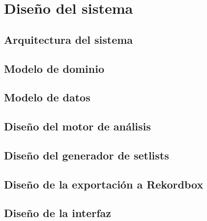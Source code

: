
\chapter{Diseño del sistema}
\label{cha:diseno}

\section{Arquitectura del sistema}
\label{sec:dis-arquitectura}


\section{Modelo de dominio}
\label{sec:dis-dominio}


\section{Modelo de datos}
\label{sec:dis-datos}


\section{Diseño del motor de análisis}
\label{sec:dis-analisis}


\section{Diseño del generador de setlists}
\label{sec:dis-generador}


\section{Diseño de la exportación a Rekordbox}
\label{sec:dis-exportacion}


\section{Diseño de la interfaz}
\label{sec:dis-interfaz}










